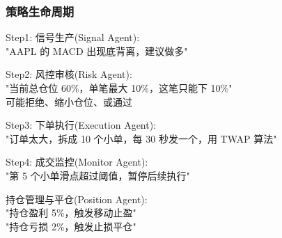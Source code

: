 \begin{frame}
    \frametitle{策略生命周期}

    \alert{Step1: 信号生产(Signal Agent)}: \\
    \hspace*{2em} "AAPL 的 MACD 出现底背离，建议做多"

    \alert{Step2: 风控审核(Risk Agent)}: \\
    \hspace*{2em} "当前总仓位 60\%，单笔最大 10\%，这笔只能下 10\%" \\
    \hspace*{2em} 可能拒绝、缩小仓位、或通过
    
    \alert{Step3: 下单执行(Execution Agent)}: \\
    \hspace*{2em} "订单太大，拆成 10 个小单，每 30 秒发一个，用 TWAP 算法"

    \alert{Step4: 成交监控(Monitor Agent)}: \\
    \hspace*{2em} "第 5 个小单滑点超过阈值，暂停后续执行"

    \alert{持仓管理与平仓(Position Agent)}: \\
    \hspace*{2em} "持仓盈利 5\%，触发移动止盈" \\
    \hspace*{2em} "持仓亏损 2\%，触发止损平仓"
\end{frame}